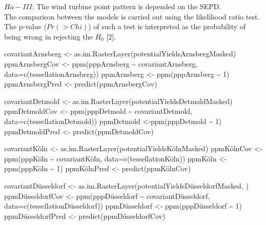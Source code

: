 \documentclass[
]{article}
\newenvironment{Shaded}{\begin{snugshade}}{\end{snugshade}}
\newcommand{\AttributeTok}[1]{\textcolor[rgb]{0.77,0.63,0.00}{#1}}
\newcommand{\DecValTok}[1]{\textcolor[rgb]{0.00,0.00,0.81}{#1}}
\newcommand{\FunctionTok}[1]{\textcolor[rgb]{0.00,0.00,0.00}{#1}}
\newcommand{\NormalTok}[1]{#1}
\newcommand{\OtherTok}[1]{\textcolor[rgb]{0.56,0.35,0.01}{#1}}
\newcommand{\SpecialCharTok}[1]{\textcolor[rgb]{0.00,0.00,0.00}{#1}}
\begin{document}
\(Ha - III\): The wind turbine point pattern is depended on the SEPD.\\

The comparison between the models is carried out using the likelihood
ratio test. The p-value (\(Pr(>Chi)\)) of such a test is interpreted as
the probability of being wrong in rejecting the \(H_{0}\) {[}2{]}.

\begin{Shaded}
\begin{Highlighting}[]
\NormalTok{covariantArnsberg }\OtherTok{\textless{}{-}} \FunctionTok{as.im.RasterLayer}\NormalTok{(potentialYieldsArnsbergMasked)}
\NormalTok{ppmArnsbergCov }\OtherTok{\textless{}{-}} \FunctionTok{ppm}\NormalTok{(pppArnsberg }\SpecialCharTok{\textasciitilde{}}\NormalTok{ covariantArnsberg, }\AttributeTok{data=}\FunctionTok{c}\NormalTok{(tessellationArnsberg))}
\NormalTok{ppmArnsberg }\OtherTok{\textless{}{-}} \FunctionTok{ppm}\NormalTok{(pppArnsberg }\SpecialCharTok{\textasciitilde{}} \DecValTok{1}\NormalTok{)}
\NormalTok{ppmArnsbergPred }\OtherTok{\textless{}{-}} \FunctionTok{predict}\NormalTok{(ppmArnsbergCov)}

\NormalTok{covariantDetmold }\OtherTok{\textless{}{-}} \FunctionTok{as.im.RasterLayer}\NormalTok{(potentialYieldsDetmoldMasked)}
\NormalTok{ppmDetmoldCov }\OtherTok{\textless{}{-}} \FunctionTok{ppm}\NormalTok{(pppDetmold }\SpecialCharTok{\textasciitilde{}}\NormalTok{ covariantDetmold, }\AttributeTok{data=}\FunctionTok{c}\NormalTok{(tessellationDetmold))}
\NormalTok{ppmDetmold }\OtherTok{\textless{}{-}}\FunctionTok{ppm}\NormalTok{(pppDetmold }\SpecialCharTok{\textasciitilde{}} \DecValTok{1}\NormalTok{)}
\NormalTok{ppmDetmoldPred }\OtherTok{\textless{}{-}} \FunctionTok{predict}\NormalTok{(ppmDetmoldCov)}

\NormalTok{covariantKöln }\OtherTok{\textless{}{-}} \FunctionTok{as.im.RasterLayer}\NormalTok{(potentialYieldsKölnMasked)}
\NormalTok{ppmKölnCov }\OtherTok{\textless{}{-}} \FunctionTok{ppm}\NormalTok{(pppKöln }\SpecialCharTok{\textasciitilde{}}\NormalTok{ covariantKöln, }\AttributeTok{data=}\FunctionTok{c}\NormalTok{(tessellationKöln))}
\NormalTok{ppmKöln }\OtherTok{\textless{}{-}} \FunctionTok{ppm}\NormalTok{(pppKöln }\SpecialCharTok{\textasciitilde{}} \DecValTok{1}\NormalTok{)}
\NormalTok{ppmKölnPred }\OtherTok{\textless{}{-}} \FunctionTok{predict}\NormalTok{(ppmKölnCov)}

\NormalTok{covariantDüsseldorf }\OtherTok{\textless{}{-}} \FunctionTok{as.im.RasterLayer}\NormalTok{(potentialYieldsDüsseldorfMasked, )}
\NormalTok{ppmDüsseldorfCov }\OtherTok{\textless{}{-}} \FunctionTok{ppm}\NormalTok{(pppDüsseldorf }\SpecialCharTok{\textasciitilde{}}\NormalTok{ covariantDüsseldorf, }\AttributeTok{data=}\FunctionTok{c}\NormalTok{(tessellationDüsseldorf))}
\NormalTok{ppmDüsseldorf }\OtherTok{\textless{}{-}} \FunctionTok{ppm}\NormalTok{(pppDüsseldorf }\SpecialCharTok{\textasciitilde{}} \DecValTok{1}\NormalTok{)}
\NormalTok{ppmDüsseldorfPred }\OtherTok{\textless{}{-}} \FunctionTok{predict}\NormalTok{(ppmDüsseldorfCov)}


\end{Highlighting}
\end{Shaded}
\end{document}
